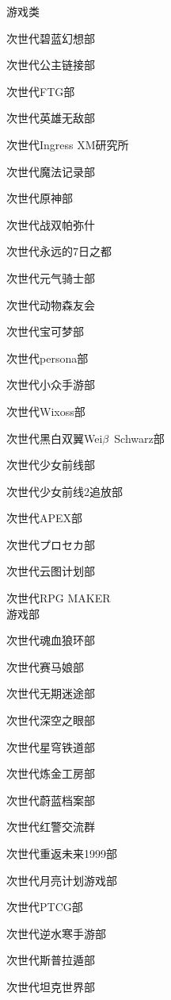 \begin{multicols}{3}
\begin{categorysection}{游戏类}
        \item 次世代碧蓝幻想部
        \item 次世代公主链接部
        \item 次世代FTG部
        \item 次世代英雄无敌部
        \item 次世代Ingress XM研究所
        \item 次世代魔法记录部
        \item 次世代原神部
        \item 次世代战双帕弥什
        \item 次世代永远的7日之都
        \item 次世代元气骑士部
        \item 次世代动物森友会
        \item 次世代宝可梦部
        \item 次世代persona部
        \item 次世代小众手游部
        \item 次世代Wixoss部
        \item 次世代黑白双翼Wei$\beta$~Schwarz部
        \item 次世代少女前线部
        \item 次世代少女前线2追放部
        \item 次世代APEX部
        \item 次世代プロセカ部
        \item 次世代云图计划部
        \item 次世代RPG MAKER\\游戏部
        \item 次世代魂血狼环部
        \item 次世代赛马娘部
        \item 次世代无期迷途部
        \item 次世代深空之眼部
        \item 次世代星穹铁道部
        \item 次世代炼金工房部
        \item 次世代蔚蓝档案部
        \item 次世代红警交流群
        \item 次世代重返未来1999部
        \item 次世代月亮计划游戏部
        \item 次世代PTCG部
        \item 次世代逆水寒手游部
        \item 次世代斯普拉遁部
        \item 次世代坦克世界部

\end{categorysection}
\end{multicols}
